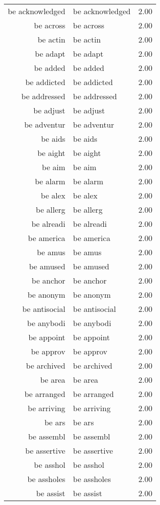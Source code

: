\begin{table}[ht]
\begin{tabular}{rlr}
  be acknowledged & be acknowledged & 2.00 \\ 
  be across & be across & 2.00 \\ 
  be actin & be actin & 2.00 \\ 
  be adapt & be adapt & 2.00 \\ 
  be added & be added & 2.00 \\ 
  be addicted & be addicted & 2.00 \\ 
  be addressed & be addressed & 2.00 \\ 
  be adjust & be adjust & 2.00 \\ 
  be adventur & be adventur & 2.00 \\ 
  be aids & be aids & 2.00 \\ 
  be aight & be aight & 2.00 \\ 
  be aim & be aim & 2.00 \\ 
  be alarm & be alarm & 2.00 \\ 
  be alex & be alex & 2.00 \\ 
  be allerg & be allerg & 2.00 \\ 
  be alreadi & be alreadi & 2.00 \\ 
  be america & be america & 2.00 \\ 
  be amus & be amus & 2.00 \\ 
  be amused & be amused & 2.00 \\ 
  be anchor & be anchor & 2.00 \\ 
  be anonym & be anonym & 2.00 \\ 
  be antisocial & be antisocial & 2.00 \\ 
  be anybodi & be anybodi & 2.00 \\ 
  be appoint & be appoint & 2.00 \\ 
  be approv & be approv & 2.00 \\ 
  be archived & be archived & 2.00 \\ 
  be area & be area & 2.00 \\ 
  be arranged & be arranged & 2.00 \\ 
  be arriving & be arriving & 2.00 \\ 
  be ars & be ars & 2.00 \\ 
  be assembl & be assembl & 2.00 \\ 
  be assertive & be assertive & 2.00 \\ 
  be asshol & be asshol & 2.00 \\ 
  be assholes & be assholes & 2.00 \\ 
  be assist & be assist & 2.00 \\ 

\end{tabular}
\end{table}
